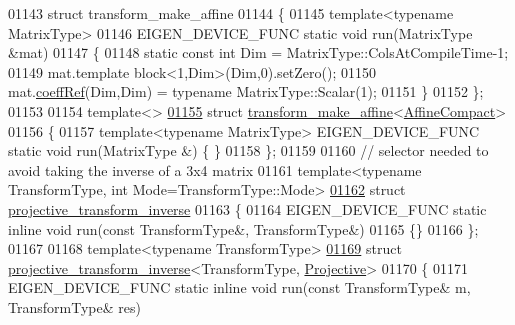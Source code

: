 \begin{DoxyCode}
01143 \textcolor{keyword}{struct }transform\_make\_affine
01144 \{
01145   \textcolor{keyword}{template}<\textcolor{keyword}{typename} MatrixType>
01146   EIGEN\_DEVICE\_FUNC \textcolor{keyword}{static} \textcolor{keywordtype}{void} run(MatrixType &mat)
01147   \{
01148     \textcolor{keyword}{static} \textcolor{keyword}{const} \textcolor{keywordtype}{int} Dim = MatrixType::ColsAtCompileTime-1;
01149     mat.template block<1,Dim>(Dim,0).setZero();
01150     mat.\hyperlink{class_eigen_1_1_plain_object_base_a25626a55b26a4323565f79d1b7c48ea8}{coeffRef}(Dim,Dim) = \textcolor{keyword}{typename} MatrixType::Scalar(1);
01151   \}
01152 \};
01153 
01154 \textcolor{keyword}{template}<>
\hyperlink{struct_eigen_1_1internal_1_1transform__make__affine_3_01_affine_compact_01_4}{01155} \textcolor{keyword}{struct }\hyperlink{struct_eigen_1_1internal_1_1transform__make__affine}{transform\_make\_affine}<\hyperlink{group__enums_ggaee59a86102f150923b0cac6d4ff05107aa30a06b60d218b709020972df47de2b0}{AffineCompact}>
01156 \{
01157   \textcolor{keyword}{template}<\textcolor{keyword}{typename} MatrixType> EIGEN\_DEVICE\_FUNC \textcolor{keyword}{static} \textcolor{keywordtype}{void} run(MatrixType &) \{ \}
01158 \};
01159     
01160 \textcolor{comment}{// selector needed to avoid taking the inverse of a 3x4 matrix}
01161 \textcolor{keyword}{template}<\textcolor{keyword}{typename} TransformType, \textcolor{keywordtype}{int} Mode=TransformType::Mode>
\hyperlink{struct_eigen_1_1internal_1_1projective__transform__inverse}{01162} \textcolor{keyword}{struct }\hyperlink{struct_eigen_1_1internal_1_1projective__transform__inverse}{projective\_transform\_inverse}
01163 \{
01164   EIGEN\_DEVICE\_FUNC \textcolor{keyword}{static} \textcolor{keyword}{inline} \textcolor{keywordtype}{void} run(\textcolor{keyword}{const} TransformType&, TransformType&)
01165   \{\}
01166 \};
01167 
01168 \textcolor{keyword}{template}<\textcolor{keyword}{typename} TransformType>
\hyperlink{struct_eigen_1_1internal_1_1projective__transform__inverse_3_01_transform_type_00_01_projective_01_4}{01169} \textcolor{keyword}{struct }\hyperlink{struct_eigen_1_1internal_1_1projective__transform__inverse}{projective\_transform\_inverse}<TransformType, 
      \hyperlink{group__enums_ggaee59a86102f150923b0cac6d4ff05107aead6a2de12a17aaa4f5c523215dfccad}{Projective}>
01170 \{
01171   EIGEN\_DEVICE\_FUNC \textcolor{keyword}{static} \textcolor{keyword}{inline} \textcolor{keywordtype}{void} run(\textcolor{keyword}{const} TransformType& m, TransformType& res)

\end{DoxyCode}
